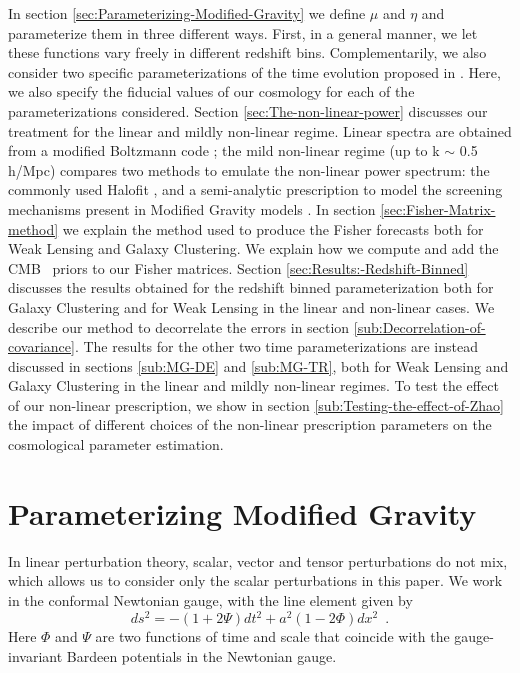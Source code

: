 In section \ref{sec:Parameterizing-Modified-Gravity} we define $\mu$ and $\eta$ and parameterize them in three different ways. First, in a general manner, we let these functions vary freely in different  redshift bins. Complementarily, we also consider two specific parameterizations of the time evolution proposed in \cite{planck_collaboration_planck_2016}. Here, we also specify the fiducial values of our cosmology for each of the
parameterizations considered.
Section \ref{sec:The-non-linear-power} discusses our treatment for the linear and mildly non-linear regime. Linear spectra are obtained from a modified Boltzmann
code \cite{hojjati_testing_2011}; the mild non-linear regime (up to k $\sim$ 0.5 h/Mpc) compares two methods to emulate the non-linear power spectrum: the commonly used Halofit \cite{smith_stable_2003, takahashi_revising_2012}, and a semi-analytic prescription to model
the screening mechanisms present in Modified Gravity models \cite{hu_parameterized_2007}.
In section \ref{sec:Fisher-Matrix-method} we explain the method used
to produce the Fisher forecasts both for Weak Lensing and Galaxy
Clustering. We explain how we compute and add the CMB \planck\ priors to our Fisher matrices.
Section \ref{sec:Results:-Redshift-Binned} discusses the results
obtained for the redshift binned parameterization both for Galaxy Clustering
and for Weak Lensing in the linear and non-linear cases. We describe our method to decorrelate the errors in section
\ref{sub:Decorrelation-of-covariance}. The results for the other two time parameterizations are instead discussed in sections \ref{sub:MG-DE} and \ref{sub:MG-TR}, both for Weak Lensing and Galaxy Clustering in the linear and mildly non-linear
regimes. To test the effect of our non-linear prescription, we show in section \ref{sub:Testing-the-effect-of-Zhao} the impact of different choices of the non-linear prescription parameters on the cosmological parameter estimation.



\section{\label{sec:Parameterizing-Modified-Gravity}Parameterizing Modified
Gravity}

In linear perturbation theory, scalar, vector and tensor perturbations
do not mix, which allows us to consider only the scalar perturbations
in this paper. We work in the conformal Newtonian gauge, with the
line element given by 
\begin{equation}
ds^{2}=-(1+2\Psi)dt^{2}+a^{2}(1-2\Phi)dx^{2}\,\,\,.
\end{equation}
Here $\Phi$ and $\Psi$ are two functions of time and scale that coincide
with the gauge-invariant Bardeen potentials in the Newtonian
gauge.

